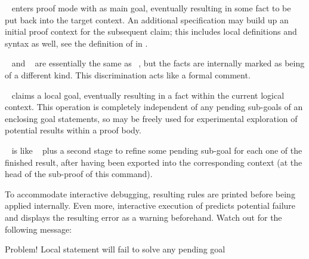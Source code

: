 \begin{isabellebody}
\begin{isamarkuptext}
  \begin{descr}
  
  \item [\mbox{\isa{\isacommand{lemma}}}~\isa{a{\isacharcolon}\ {\isasymphi}}] enters proof mode with
  \isa{{\isasymphi}} as main goal, eventually resulting in some fact \isa{{\isasymturnstile}\ {\isasymphi}} to be put back into the target context.  An additional
   specification may build up an initial proof
  context for the subsequent claim; this includes local definitions
  and syntax as well, see the definition of \mbox{} in
  .
  
  \item [\mbox{\isa{\isacommand{theorem}}}~\isa{a{\isacharcolon}\ {\isasymphi}} and \mbox{\isa{\isacommand{corollary}}}~\isa{a{\isacharcolon}\ {\isasymphi}}] are essentially the same as \mbox{}~, but the facts are internally marked as
  being of a different kind.  This discrimination acts like a formal
  comment.
  
  \item [\mbox{\isa{\isacommand{have}}}~\isa{a{\isacharcolon}\ {\isasymphi}}] claims a local goal,
  eventually resulting in a fact within the current logical context.
  This operation is completely independent of any pending sub-goals of
  an enclosing goal statements, so \mbox{} may be freely
  used for experimental exploration of potential results within a
  proof body.
  
  \item [\mbox{\isa{\isacommand{show}}}~\isa{a{\isacharcolon}\ {\isasymphi}}] is like \mbox{}~ plus a second stage to refine some pending
  sub-goal for each one of the finished result, after having been
  exported into the corresponding context (at the head of the
  sub-proof of this \mbox{} command).
  
  To accommodate interactive debugging, resulting rules are printed
  before being applied internally.  Even more, interactive execution
  of \mbox{} predicts potential failure and displays the
  resulting error as a warning beforehand.  Watch out for the
  following message:

  \begin{ttbox}
  Problem! Local statement will fail to solve any pending goal
  \end{ttbox}
  

\end{descr}
\end{isamarkuptext}
\end{isabellebody}
